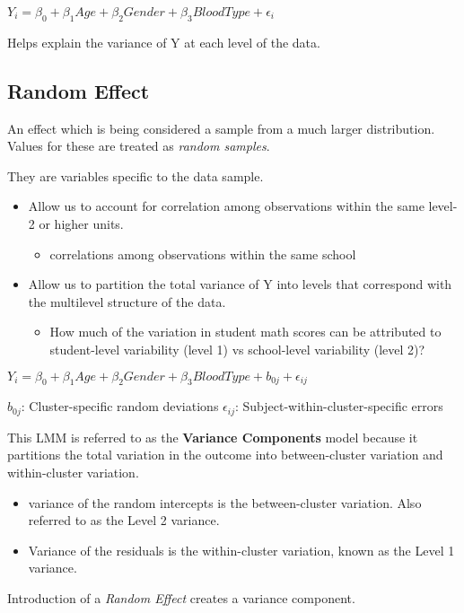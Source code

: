 \documentclass[11pt]{article}
\begin{document}
\(Y_i = \beta_0 + \beta_1 Age + \beta_2 Gender + \beta_3 BloodType + \epsilon_i\)

Helps explain the variance of Y at each level of the data.

\subsection{Random Effect}
\label{sec:org3c9652d}
An effect which is being considered a sample from a much larger distribution.
Values for these are treated as \emph{random samples}.

They are variables specific to the data sample.
\begin{itemize}
\item Allow us to account for correlation among observations within the same level-2
or higher units.
\begin{itemize}
\item correlations among observations within the same school
\end{itemize}
\item Allow us to partition the total variance of Y into levels that correspond with
the multilevel structure of the data.
\begin{itemize}
\item How much of the variation in student math scores can be attributed to
student-level variability (level 1) vs school-level variability (level 2)?
\end{itemize}
\end{itemize}

\(Y_i = \beta_0 + \beta_1 Age + \beta_2 Gender + \beta_3 BloodType + b_{0j} + \epsilon_{ij}\)

\(b_{0j}\): Cluster-specific random deviations
\(\epsilon_{ij}\): Subject-within-cluster-specific errors

This LMM is referred to as the \textbf{Variance Components} model because it partitions
the total variation in the outcome into between-cluster variation and
within-cluster variation.
\begin{itemize}
\item variance of the random intercepts is the between-cluster variation. Also
referred to as the Level 2 variance.
\item Variance of the residuals is the within-cluster variation, known as the Level
1 variance.
\end{itemize}
Introduction of a \emph{Random Effect} creates a variance component.
\end{document}
